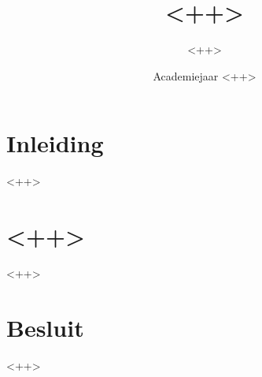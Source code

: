 \documentclass[a4paper,kul]{kulakarticle}
\date{Academiejaar <++>}
\title{<++>}
\author{<++>}
\begin{document}
\maketitle

\section*{Inleiding}

    <++>

\section{<++>}

    <++>

\section*{Besluit}

    <++>
\end{document}
